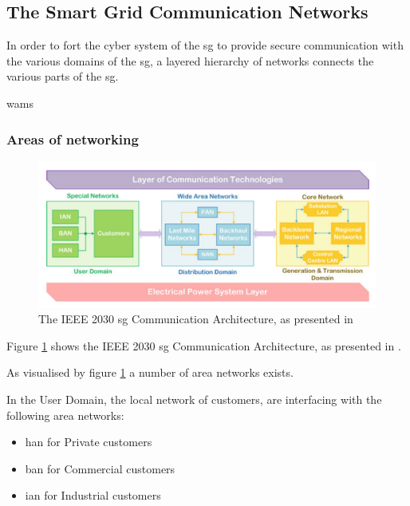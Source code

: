 



\subsection{The Smart Grid Communication Networks}



In order to fort the cyber system of the \acrlong{sg} to provide secure communication with the various domains of the \acrlong{sg}, a layered hierarchy of networks connects the various parts of the \acrshort{sg}.

\acrfull{wams}



\subsubsection{Areas of networking}


\begin{figure}[ht]
\includegraphics[width=\linewidth]{figures/IEEE2030-SG-CommunicationArchitecture.png}
\caption{The IEEE 2030 \acrlong{sg} Communication Architecture, as presented in \cite{Kabalci2019}}
\label{fig:IEEE2030-SG-CommunicationArchitecture}
\end{figure}


Figure \ref{fig:IEEE2030-SG-CommunicationArchitecture} shows the IEEE 2030 \acrlong{sg} Communication Architecture, as presented in \cite{Kabalci2019}.

As visualised by figure \ref{fig:IEEE2030-SG-CommunicationArchitecture} a number of area networks exists.

In the User Domain, the local network of customers, are interfacing with the following area networks: 
\begin{itemize}
\item \acrfull{han} for Private customers %
\item \acrfull{ban} for Commercial customers %
\item \acrfull{ian} for Industrial customers %
\end{itemize}

